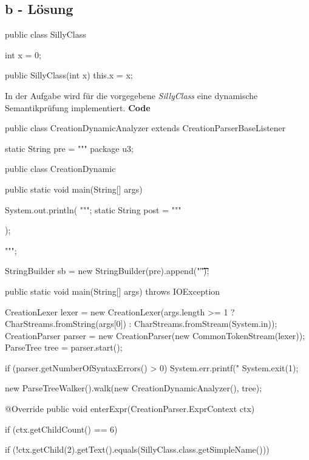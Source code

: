 \subsection*{b - Lösung}
\newline
\begin{code}[language=java, caption={\textit{SillyClass} als Vorgabe für dynamische Semantikprüfung}, label={lst:Aufgabe3b}]
public class SillyClass {
    int x = 0;

    public SillyClass(int x) {
        this.x = x;
    }
}
\end{code}
\newline
In der Aufgabe wird für die vorgegebene \textit{SillyClass} eine dynamische Semantikprüfung implementiert.
\newline
\newline
\textbf{Code}
\begin{code}[language=java, caption={ParserListener für dynamische Semantik}, label={lst:Aufgabe3b}]
public class CreationDynamicAnalyzer extends CreationParserBaseListener {

    static String pre = """
            package u3;

            public class CreationDynamic {
                public static void main(String[] args) {
                    System.out.println(
                    """;
    static String post = """

                    );
                }
            }""";

    StringBuilder sb = new StringBuilder(pre).append("\t\t\t");

    public static void main(String[] args) throws IOException {
        CreationLexer lexer = new CreationLexer(args.length >= 1 ?
                CharStreams.fromString(args[0]) : CharStreams.fromStream(System.in));
        CreationParser parser = new CreationParser(new CommonTokenStream(lexer));
        ParseTree tree = parser.start();

        if (parser.getNumberOfSyntaxErrors() > 0) {
            System.err.printf("%
            System.exit(1);
        }

        new ParseTreeWalker().walk(new CreationDynamicAnalyzer(), tree);

    }

    @Override
    public void enterExpr(CreationParser.ExprContext ctx) {
        if (ctx.getChildCount() == 6) {

            if (!ctx.getChild(2).getText().equals(SillyClass.class.getSimpleName())) {

}}}}
\end{code}
